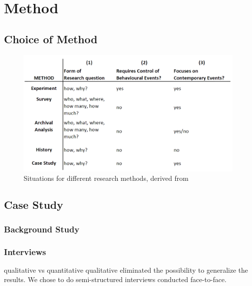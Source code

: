 \chapter{Method}

\section{Choice of Method}


\begin{figure}[h]
\begin{center}
\includegraphics[scale=0.35]{methods.png}
\caption[Situations for different research methods]{Situations for different research methods, derived from \cite{CaseStudyResearch}}
\label{fig:methods}
\end{center}
\end{figure}

  

\section{Case Study}

\subsection{Background Study}

\subsection{Interviews}

qualitative vs quantitative
qualitative eliminated the possibility to generalize the results. We chose to do semi-structured interviews conducted face-to-face.   




